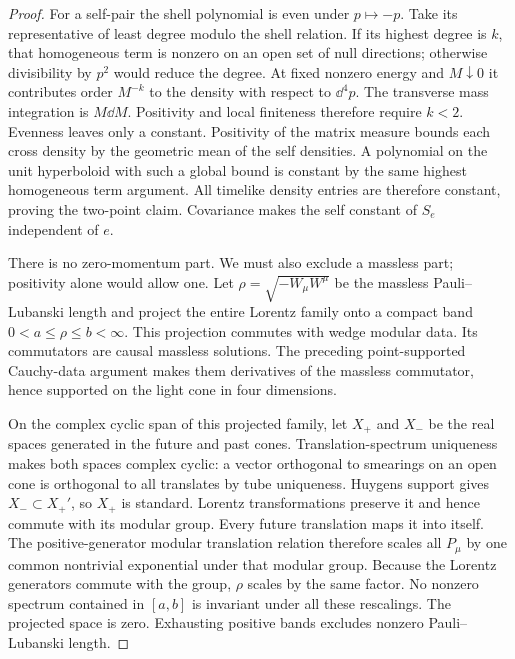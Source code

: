\begin{proof}
For a self-pair the shell polynomial is even under $p\mapsto-p$.
Take its representative of least degree modulo the shell relation.
If its highest degree is $k$, that homogeneous term is nonzero on an
open set of null directions; otherwise divisibility by $p^2$ would
reduce the degree.  At fixed nonzero energy and $M\downarrow0$ it
contributes order $M^{-k}$ to the density with respect to $\dd^4p$.
The transverse mass integration is $M\dd M$.  Positivity and local
finiteness therefore require $k<2$.  Evenness leaves only a constant.
Positivity of the matrix measure bounds each cross density by the
geometric mean of the self densities.  A polynomial on the unit
hyperboloid with such a global bound is constant by the same highest
homogeneous term argument.  All timelike density entries are therefore
constant, proving the two-point claim.  Covariance makes the self
constant of $S_e$ independent of $e$.

There is no zero-momentum part.  We must also exclude a massless part;
positivity alone would allow one.  Let $\rho=\sqrt{-W_\mu W^\mu}$ be
the massless Pauli--Lubanski length and project the entire Lorentz family
onto a compact band $0<a\leq\rho\leq b<\infty$.  This projection
commutes with wedge modular data.  Its commutators are causal massless
solutions.  The preceding point-supported Cauchy-data argument makes
them derivatives of the massless commutator, hence supported on the
light cone in four dimensions.

On the complex cyclic span of this projected family, let $X_+$ and
$X_-$ be the real spaces generated in the future and past cones.
Translation-spectrum uniqueness makes both spaces complex cyclic:
a vector orthogonal to smearings on an open cone is orthogonal to all
translates by tube uniqueness.  Huygens support gives
$X_-\subset X_+'$, so $X_+$ is standard.  Lorentz transformations
preserve it and hence commute with its modular group.  Every future
translation maps it into itself.  The positive-generator modular
translation relation therefore scales all $P_\mu$ by one common
nontrivial exponential under that modular group.  Because the Lorentz
generators commute with the group, $\rho$ scales by the same factor.
No nonzero spectrum contained in $[a,b]$ is invariant under all these
rescalings.  The projected space is zero.  Exhausting positive bands
excludes nonzero Pauli--Lubanski length.


\end{proof}

